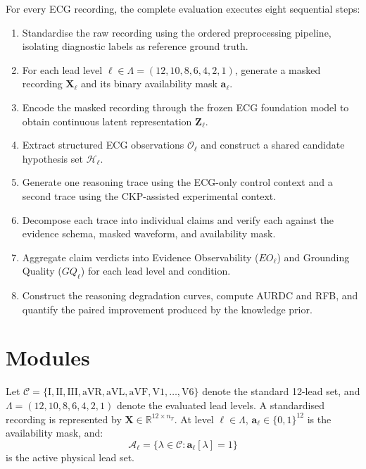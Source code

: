 \documentclass{ssnreview}
\begin{document}
For every ECG recording, the complete evaluation executes eight sequential steps:
\begin{enumerate}[label=\textbf{Step \arabic*:},leftmargin=*,align=left]
  \item Standardise the raw recording using the ordered preprocessing pipeline, isolating
  diagnostic labels as reference ground truth.
  \item For each lead level $\ell \in \Lambda = (12, 10, 8, 6, 4, 2, 1)$, generate a masked
  recording $\mathbf{X}_\ell$ and its binary availability mask $\mathbf{a}_\ell$.
  \item Encode the masked recording through the frozen ECG foundation model to obtain continuous
  latent representation $\mathbf{Z}_\ell$.
  \item Extract structured ECG observations $\mathcal{O}_\ell$ and construct a shared candidate
  hypothesis set $\mathcal{H}_\ell$.
  \item Generate one reasoning trace using the ECG-only control context and a second trace
  using the CKP-assisted experimental context.
  \item Decompose each trace into individual claims and verify each against the evidence
  schema, masked waveform, and availability mask.
  \item Aggregate claim verdicts into Evidence Observability ($EO_\ell$) and Grounding Quality
  ($GQ_\ell$) for each lead level and condition.
  \item Construct the reasoning degradation curves, compute AURDC and RFB, and quantify the
  paired improvement produced by the knowledge prior.
\end{enumerate}

\section{Modules}

Let $\mathcal{C} = \{\mathrm{I},\mathrm{II},\mathrm{III},\mathrm{aVR},\mathrm{aVL},\mathrm{aVF},\mathrm{V1},\ldots,\mathrm{V6}\}$
denote the standard 12-lead set, and $\Lambda = (12, 10, 8, 6, 4, 2, 1)$ denote the evaluated
lead levels. A standardised recording is represented by $\mathbf{X}\in\mathbb{R}^{12\times n_T}$.
At level $\ell\in\Lambda$, $\mathbf{a}_\ell\in\{0,1\}^{12}$ is the availability mask, and:
\begin{equation}
  \mathcal{A}_\ell = \{\lambda\in\mathcal{C}:\mathbf{a}_\ell[\lambda]=1\}
\end{equation}
is the active physical lead set.
\end{document}
